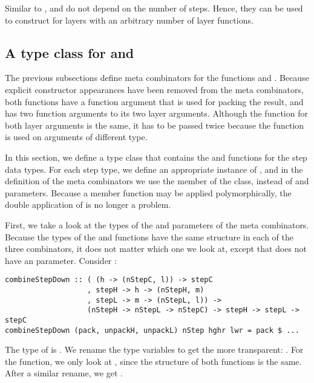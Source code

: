 Similar to ,  and  do not depend on the number of steps. Hence, they can be used to construct  for layers with an arbitrary number of layer functions.

%																
\subsection{A type class for  and } \label{sect:typeClass}


\bc The previous subsections define meta combinators for the functions  and . Because explicit constructor appearances have been removed from the meta combinators, both functions have a function argument that is used for packing the result, and  has two function arguments to  its two layer arguments. Although the  function for both layer arguments is the same, it has to be passed twice because the function is used on arguments of different type. \ec

In this section, we define a type class  that contains the  and  functions for the step data types. For each step type, we define an appropriate instance of , and in the definition of the meta combinators we use the member of the class, instead of  and  parameters. Because a member function may be applied polymorphically, the double application of  is no longer a problem.

First, we take a look at the types of the  and  parameters of the meta combinators. Because the types of the  and  functions have the same structure in each of the three combinators, it does not matter which one we look at, except that  does not have an  parameter. Consider :

\begin{small}
\begin{verbatim}
combineStepDown :: ( (h -> (nStepC, l)) -> stepC 
                   , stepH -> h -> (nStepH, m)
                   , stepL -> m -> (nStepL, l)) -> 
                   (nStepH -> nStepL -> nStepC) -> stepH -> stepL -> stepC
combineStepDown (pack, unpackH, unpackL) nStep hghr lwr = pack $ ...
\end{verbatim}
\end{small}

The type of  is . We rename the type variables  to get the more transparent: . For the  function, we only look at , since the structure of both  functions is the same. After a similar rename, we get .

